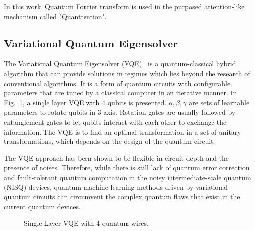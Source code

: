 In this work, Quantum Fourier transform is used in the purposed attention-like mechanism called "Quanttention".

\subsection{Variational Quantum Eigensolver}

The Variational Quantum Eigensolver (VQE)~\cite{} is a quantum-classical hybrid algorithm that can provide solutions in regimes which lies beyond the research of conventional algorithms. It is a form of quantum circuits with configurable parameters that are tuned by a classical computer in an iterative manner. In Fig.~\ref{fig:vqe}, a single layer VQE with 4 qubits is presented. $\alpha, \beta, \gamma$ are sets of learnable parameters to rotate qubits in 3-axis. Rotation gates are usually followed by entanglement gates to let qubits interact with each other to exchange the information. The VQE is to find an optimal transformation in a set of unitary transformations, which depends on the design of the quantum circuit.

The VQE approach has been shown to be flexible in circuit depth and the presence of noises. Therefore, while there is still lack of quantum error correction and fault-tolerant quantum computation in the noisy intermediate-scale quantum (NISQ) devices, quantum machine learning methods driven by variational quantum circuits can circumvent the complex quantum flaws that exist in the current quantum devices.


\begin{figure}[htp]
  \centering
  \caption{Single-Layer VQE with 4 quantum wires.}
  \label{fig:vqe}
\end{figure}

